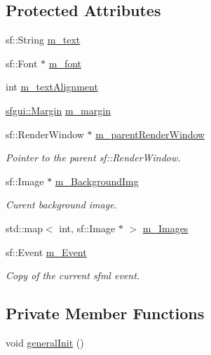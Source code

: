 \subsection*{Protected Attributes}
\begin{CompactItemize}
\item 
sf::String \hyperlink{classsfgui_1_1Object_b63c033215c2f6f1d64645e3c6f0153b}{m\_\-text}
\item 
sf::Font $\ast$ \hyperlink{classsfgui_1_1Object_20ec4624e3d9b8e3cebeb71ec97fd104}{m\_\-font}
\item 
int \hyperlink{classsfgui_1_1Object_7cfb56995f2140319df705fb1b146d36}{m\_\-textAlignment}
\item 
\hyperlink{structsfgui_1_1Margin}{sfgui::Margin} \hyperlink{classsfgui_1_1Object_b7afeee103f0cfc0c045effa8527a4b4}{m\_\-margin}
\item 
sf::RenderWindow $\ast$ \hyperlink{classsfgui_1_1Object_518ad23f1c9aab6fd9b346d708c503a8}{m\_\-parentRenderWindow}
\begin{CompactList}\small\item\em Pointer to the parent sf::RenderWindow. \item\end{CompactList}\item 
sf::Image $\ast$ \hyperlink{classsfgui_1_1Object_08225eee55352c02435d14e1bce24dbe}{m\_\-BackgroundImg}
\begin{CompactList}\small\item\em Curent background image. \item\end{CompactList}\item 
std::map$<$ int, sf::Image $\ast$ $>$ \hyperlink{classsfgui_1_1Object_6d7907f767742dcfd37c1b0c349daa2d}{m\_\-Images}
\item 
sf::Event \hyperlink{classsfgui_1_1Object_bd45c91f926c930806870ce8acbb955e}{m\_\-Event}
\begin{CompactList}\small\item\em Copy of the current sfml event. \item\end{CompactList}\end{CompactItemize}
\subsection*{Private Member Functions}
\begin{CompactItemize}
\item 
void \hyperlink{classsfgui_1_1Object_d2750b3d51a3a208739ed6c0c57df6aa}{generalInit} ()
\end{CompactItemize}
